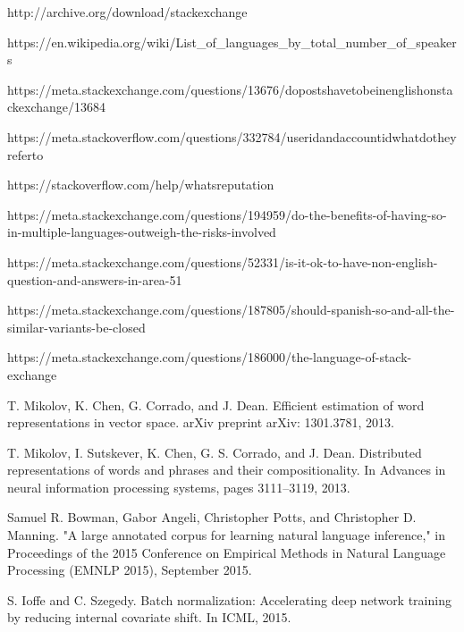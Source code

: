 
\begin{thebibliography}{1}

http://archive.org/download/stackexchange

 https://en.wikipedia.org/wiki/List\_of\_languages\_by\_total\_number\_of\_speakers
 
 https://meta.stackexchange.com/questions/13676/do\-posts\-have\-to\-be\-in\-english\-on\-stack\-exchange/13684

 https://meta.stackoverflow.com/questions/332784/user\-id\-and\-account\-id\-what\-do\-they\-refer\-to
 
https://stackoverflow.com/help/whats\-reputation 

https://meta.stackexchange.com/questions/194959/do-the-benefits-of-having-so-in-multiple-languages-outweigh-the-risks-involved

https://meta.stackexchange.com/questions/52331/is-it-ok-to-have-non-english-question-and-answers-in-area-51

https://meta.stackexchange.com/questions/187805/should-spanish-so-and-all-the-similar-variants-be-closed

https://meta.stackexchange.com/questions/186000/the-language-of-stack-exchange

 T. Mikolov, K. Chen, G. Corrado, and J. Dean. Efficient estimation of word representations in vector space. arXiv preprint arXiv: 1301.3781, 2013. 
 
 T. Mikolov, I. Sutskever, K. Chen, G. S. Corrado, and J. Dean. Distributed representations of words and phrases and their compositionality. In Advances in neural information processing systems, pages 3111–3119, 2013.

Samuel R. Bowman, Gabor Angeli, Christopher Potts, and Christopher D. Manning. "A large annotated corpus for learning natural language inference," in Proceedings of the 2015 Conference on Empirical Methods in Natural Language Processing (EMNLP 2015), September 2015.

S. Ioffe and C. Szegedy. Batch normalization: Accelerating deep network training by reducing internal covariate shift. In ICML, 2015.
   

\end{thebibliography}
